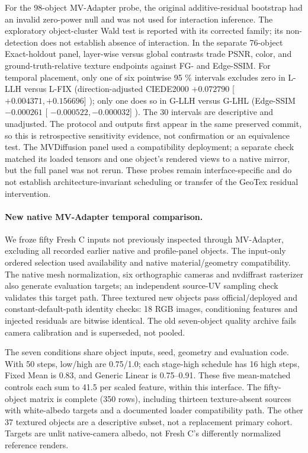 \documentclass[times,twocolumn,final]{elsarticle}
\providecommand{\DIFadd}[1]{{\protect\color{blue} \sf #1}} %
\providecommand{\DIFaddbegin}{} %
\providecommand{\DIFaddend}{} %
\begin{document}
  \DIFaddbegin \DIFadd{For the 98-object MV-Adapter probe, the original additive-residual bootstrap had an invalid zero-power null and was not used for interaction inference. The exploratory object-cluster Wald test is reported with its corrected family; its non-detection does not establish absence of interaction. In the separate 76-object Exact-holdout panel, layer-wise versus global contrasts trade PSNR, color, and ground-truth-relative texture endpoints against FG- }\DIFaddend and   \DIFaddbegin \DIFadd{Edge-SSIM. For temporal placement, only one of six pointwise }\DIFaddend 95  \DIFaddbegin \DIFadd{\% intervals excludes zero in L-LLH versus L-FIX (direction-adjusted CIEDE2000 $+0.072790$ }[\DIFadd{$+0.004371,+0.156696$}]\DIFadd{); only one does so in G-LLH versus G-LHL (Edge-SSIM $-0.000261$ }[\DIFadd{$-0.000522,-0.000032$}]\DIFadd{). The 30 intervals are descriptive and unadjusted. The protocol and outputs first appear in the same preserved commit, so this is retrospective sensitivity evidence, not confirmation or an equivalence test. The MVDiffusion panel used a compatibility deployment; a separate check matched its loaded tensors and one object's rendered views to a native mirror, but the full panel was not rerun. These probes remain interface-specific and do not establish architecture-invariant scheduling or transfer of the GeoTex residual intervention.
}\DIFaddend 


  \DIFaddbegin \paragraph{New native MV-Adapter temporal comparison.}
\label{subsec:new-mva}
\DIFadd{We froze fifty Fresh C inputs not previously inspected through MV-Adapter, excluding all recorded earlier native and profile-panel objects. The input-only ordered selection used availability and native material/geometry compatibility. The native mesh normalization, six orthographic cameras and nvdiffrast rasterizer also generate evaluation targets; an independent source-UV sampling check validates this target path. Three textured new objects pass official/deployed and constant-default-path identity checks: 18 RGB images, conditioning features and injected residuals are bitwise identical. The old seven-object quality archive fails camera calibration and is superseded, not pooled.
}\DIFaddend 

  \DIFaddbegin \DIFadd{The seven conditions share object inputs, seed, geometry and evaluation code. With 50 steps, low/high are 0.75/1.0; each stage-high schedule has 16 high steps, Fixed Mean is 0.83, and Generic Linear is 0.75--0.91. These five mean-matched controls each sum to 41.5 per scaled feature, within this interface. The fifty-object matrix is complete (350 rows), including thirteen texture-absent sources with white-albedo targets and a documented loader compatibility path. The other 37 textured objects are a descriptive subset, not a replacement primary cohort. Targets are unlit native-camera albedo, not Fresh C's differently normalized reference renders}\DIFaddend .
\end{document}
